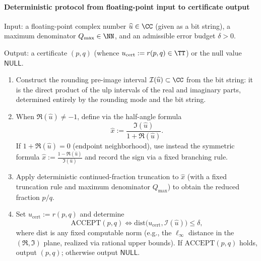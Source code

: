 \paragraph{Deterministic protocol from floating-point input to certificate output}
\begin{algorithm}\label{alg:unitary-two-integer-deterministic}
Input: a floating-point complex number \(\widehat u\in\CC\) (given as a bit string), a maximum denominator \(Q_{\max}\in\NN\), and an admissible error budget \(\delta>0\).

\smallskip
\noindent Output: a certificate \((p,q)\) (whence \(u_{\mathrm{cert}}:=r(p,q)\in\TT\)) or the null value \(\mathsf{NULL}\).
\begin{enumerate}
  \item Construct the rounding pre-image interval \(\mathcal{I}(\widehat u)\subset\CC\) from the bit string: it is the direct product of the ulp intervals of the real and imaginary parts, determined entirely by the rounding mode and the bit string.
  \item When \(\Re(\widehat u)\neq-1\), define via the half-angle formula
  \[
  \widehat x:=\frac{\Im(\widehat u)}{1+\Re(\widehat u)}.
  \]
  If \(1+\Re(\widehat u)=0\) (endpoint neighborhood), use instead the symmetric formula
  \(
  \widehat x:=\frac{1-\Re(\widehat u)}{\Im(\widehat u)}
  \)
  and record the sign via a fixed branching rule.
  \item Apply deterministic continued-fraction truncation to \(\widehat x\) (with a fixed truncation rule and maximum denominator \(Q_{\max}\)) to obtain the reduced fraction \(p/q\).
  \item Set \(u_{\mathrm{cert}}:=r(p,q)\) and determine
  \[
  \mathrm{ACCEPT}(p,q)\Longleftrightarrow
  \mathrm{dist}\bigl(u_{\mathrm{cert}},\mathcal{I}(\widehat u)\bigr)\le\delta,
  \]
  where \(\mathrm{dist}\) is any fixed computable norm (e.g., the \(\ell_{\infty}\) distance in the \((\Re,\Im)\) plane, realized via rational upper bounds).
  If \(\mathrm{ACCEPT}(p,q)\) holds, output \((p,q)\); otherwise output \(\mathsf{NULL}\).
\end{enumerate}
\end{algorithm}

